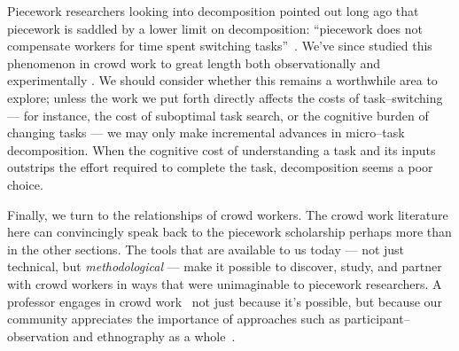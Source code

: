 \documentclass[trackingWork]{subfiles}
\begin{document}
Piecework researchers looking into decomposition pointed out long ago that
piecework is saddled by a lower limit on decomposition:
``piecework does not compensate workers for time spent switching tasks''~\cite{bewley1999wages}.
We've since studied this phenomenon in crowd work to great length both
observationally \cite{taskSearch} and
experimentally \cite{delayAndOrderLasecki}.
We should consider whether this remains a worthwhile area to explore; %
unless the work we put forth directly affects the costs of task--switching
--- for instance, the cost of suboptimal task search, or the cognitive burden of changing tasks ---
we may only make incremental advances in micro--task decomposition.
When the cognitive cost of understanding a task and its inputs outstrips the effort required to complete the task, decomposition seems a poor choice.

Finally, we turn to the relationships of crowd workers.
The crowd work literature here can convincingly speak back to
the piecework scholarship perhaps more than in the other sections.
The tools that are available to us today
--- not just technical, but \textit{methodological} ---
make it possible to
discover,
study, and
partner with 
crowd workers in ways that were unimaginable to piecework researchers.
A professor engages in crowd work~\cite{bighamHalfWorkday}
not just because it's possible, but because our community
appreciates the importance of approaches such as participant--observation and ethnography as a whole~\cite{olson2014ways}.


\onlyinsubfile{
  \balance{}
  \printbibliography
}
\end{document}
